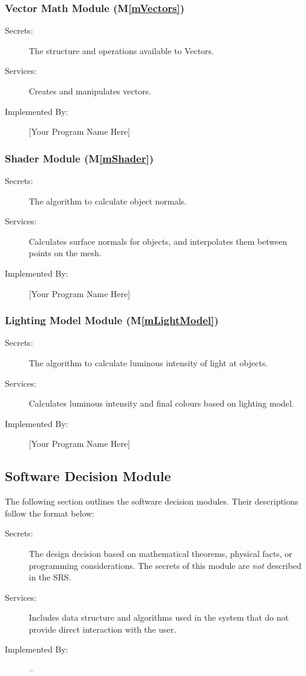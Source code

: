 \documentclass[12pt, titlepage]{article}
\newcommand{\mref}[1]{M\ref{#1}}
\begin{document}
\subsubsection{Vector Math Module (\mref{mVectors})}
\begin{description}
	\item[Secrets:]The structure and operations available to Vectors.
	\item[Services:]Creates and manipulates vectors.
	\item[Implemented By:] [Your Program Name Here]
\end{description}

\subsubsection{Shader Module (\mref{mShader})}
\begin{description}
	\item[Secrets:]The algorithm to calculate object normals.
	\item[Services:]Calculates surface normals for objects, and interpolates 
	them between points on the mesh.
	\item[Implemented By:] [Your Program Name Here]
\end{description}

\subsubsection{Lighting Model Module (\mref{mLightModel})}
\begin{description}
	\item[Secrets:]The algorithm to calculate luminous intensity of light at 
	objects.
	\item[Services:]Calculates luminous intensity and final colours based on 
	lighting model.
	\item[Implemented By:] [Your Program Name Here]
\end{description}

\subsection{Software Decision Module}
The following section outlines the software decision modules. Their 
descriptions follow the format below: 

\begin{description}
	\item[Secrets:] The design decision based on mathematical theorems, physical
	facts, or programming considerations. The secrets of this module are
	\emph{not} described in the SRS.
	\item[Services:] Includes data structure and algorithms used in the system 
	that
	do not provide direct interaction with the user. 
	\item[Implemented By:] --
\end{description}
\end{document}
